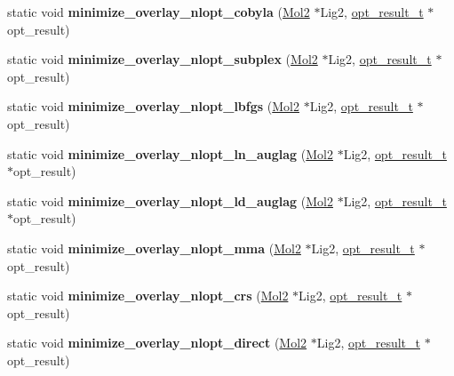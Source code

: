 \begin{DoxyCompactItemize}
\item 
\hypertarget{classOptimizer_aa4dfc6df1c44e9be45c40fdf8d5a9041}{
static void {\bfseries minimize\_\-overlay\_\-nlopt\_\-cobyla} (\hyperlink{classMol2}{Mol2} $\ast$Lig2, \hyperlink{structOptimizer_1_1opt__result__t}{opt\_\-result\_\-t} $\ast$opt\_\-result)}
\label{classOptimizer_aa4dfc6df1c44e9be45c40fdf8d5a9041}

\item 
\hypertarget{classOptimizer_a95094208f71f945463ad540b274c48d4}{
static void {\bfseries minimize\_\-overlay\_\-nlopt\_\-subplex} (\hyperlink{classMol2}{Mol2} $\ast$Lig2, \hyperlink{structOptimizer_1_1opt__result__t}{opt\_\-result\_\-t} $\ast$opt\_\-result)}
\label{classOptimizer_a95094208f71f945463ad540b274c48d4}

\item 
\hypertarget{classOptimizer_a1d88ee253a63b6529e6a26daff761a7b}{
static void {\bfseries minimize\_\-overlay\_\-nlopt\_\-lbfgs} (\hyperlink{classMol2}{Mol2} $\ast$Lig2, \hyperlink{structOptimizer_1_1opt__result__t}{opt\_\-result\_\-t} $\ast$opt\_\-result)}
\label{classOptimizer_a1d88ee253a63b6529e6a26daff761a7b}

\item 
\hypertarget{classOptimizer_ada0f69b357d7bfe823a9c2e32e43d78b}{
static void {\bfseries minimize\_\-overlay\_\-nlopt\_\-ln\_\-auglag} (\hyperlink{classMol2}{Mol2} $\ast$Lig2, \hyperlink{structOptimizer_1_1opt__result__t}{opt\_\-result\_\-t} $\ast$opt\_\-result)}
\label{classOptimizer_ada0f69b357d7bfe823a9c2e32e43d78b}

\item 
\hypertarget{classOptimizer_aa7582a886e66ad804a4e1bb16c41c159}{
static void {\bfseries minimize\_\-overlay\_\-nlopt\_\-ld\_\-auglag} (\hyperlink{classMol2}{Mol2} $\ast$Lig2, \hyperlink{structOptimizer_1_1opt__result__t}{opt\_\-result\_\-t} $\ast$opt\_\-result)}
\label{classOptimizer_aa7582a886e66ad804a4e1bb16c41c159}

\item 
\hypertarget{classOptimizer_aa14d3efb62930e170820f6e649e82642}{
static void {\bfseries minimize\_\-overlay\_\-nlopt\_\-mma} (\hyperlink{classMol2}{Mol2} $\ast$Lig2, \hyperlink{structOptimizer_1_1opt__result__t}{opt\_\-result\_\-t} $\ast$opt\_\-result)}
\label{classOptimizer_aa14d3efb62930e170820f6e649e82642}

\item 
\hypertarget{classOptimizer_a7826f3f1b4b0a22c32debf21486ce7b4}{
static void {\bfseries minimize\_\-overlay\_\-nlopt\_\-crs} (\hyperlink{classMol2}{Mol2} $\ast$Lig2, \hyperlink{structOptimizer_1_1opt__result__t}{opt\_\-result\_\-t} $\ast$opt\_\-result)}
\label{classOptimizer_a7826f3f1b4b0a22c32debf21486ce7b4}

\item 
\hypertarget{classOptimizer_afc3fa17e2c1d1e9124eb55e8c651639a}{
static void {\bfseries minimize\_\-overlay\_\-nlopt\_\-direct} (\hyperlink{classMol2}{Mol2} $\ast$Lig2, \hyperlink{structOptimizer_1_1opt__result__t}{opt\_\-result\_\-t} $\ast$opt\_\-result)}
\label{classOptimizer_afc3fa17e2c1d1e9124eb55e8c651639a}

\end{DoxyCompactItemize}
